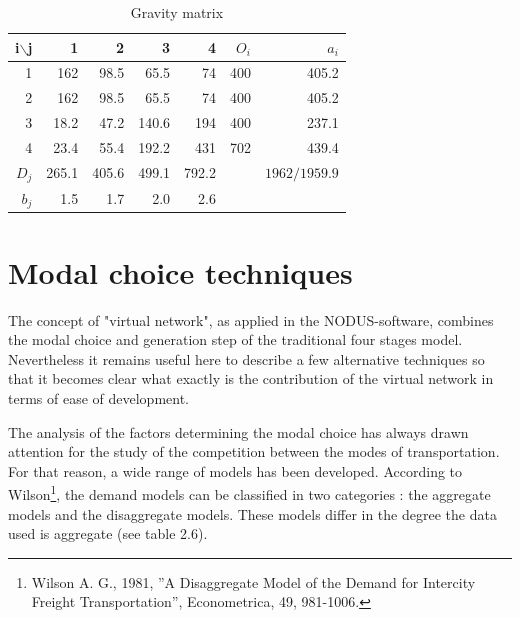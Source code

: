 \begin{table}[htbp]
\begin{center}
\begin{tabular}{rrrrrrr}
\hline
i$\backslash$j & 1 & 2 & 3 & 4 & $O_i$ & $a_i$\\
\hline
1 & 162 & 98.5 & 65.5 & 74 & 400 & 405.2\\

2 & 162 & 98.5 & 65.5 & 74 & 400 & 405.2\\

3 & 18.2 & 47.2 & 140.6 & 194 & 400 & 237.1\\

4 & 23.4 & 55.4 & 192.2 & 431 & 702 & 439.4\\

$D_j$ & 265.1 & 405.6 & 499.1 & 792.2 & & $1962 / 1959.9$\\


$b_j$ & 1.5 & 1.7 & 2.0 & 2.6 & &\\
\hline
\end{tabular}
\caption{\label{tab2_5} Gravity matrix}
\end{center}
\end{table}



\section{Modal choice techniques}

The concept of "virtual network", as applied in the NODUS-software, combines
the modal choice and generation step of the traditional four
stages model.  Nevertheless it remains useful here to describe a few alternative
techniques so that it becomes clear what exactly is the contribution of the
virtual network in terms of ease of development.

The analysis of the factors determining the modal choice has always drawn
attention for the study of the competition between the modes of transportation.
For that reason, a wide range of models has been developed.  According to
Wilson\footnote{Wilson A. G., 1981, ''A Disaggregate Model of the Demand for
Intercity Freight Transportation'', Econometrica, 49, 981-1006.}, the demand
models can be classified in two categories : the aggregate models and the
disaggregate models.  These models differ in the degree 
the data used is aggregate (see table 2.6).



